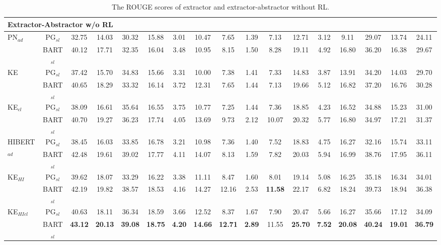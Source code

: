 \begin{table*}[ht!]
\begin{tabular}{|l|c|c|c|c|c|c|c|c|c|c|c|c|c|c|c|c|}
        \multicolumn{17}{|l|}{\bf Extractor-Abstractor w/o RL}\\
        \hline
		\multirow{2}{*}{PN$_{ad}$} & PG$_{sl}$ & 32.75 & 14.03 & 30.32 & 15.88 & 3.01 & 10.47 & 7.65& 1.39& 7.13 & 12.71& 3.12& 9.11 & 29.07 & 13.74& 24.11\\
		& BART$_{sl}$ & 40.12 & 17.71 & 32.35 & 16.04 & 3.48 & 10.95 & 8.15 & 1.50 & 8.28 & 19.11 & 4.92 & 16.80 & 36.20& 16.38& 29.67\\
        \hline
		\multirow{2}{*}{KE} & PG$_{sl}$ & 37.42 & 15.70 & 34.83 & 15.66 & 3.31 & 10.00 & 7.38 & 1.41 & 7.33 & 14.83 &3.87 & 13.91 &34.20 &14.03 & 29.70\\
		& BART$_{sl}$ & 40.65 & 18.29 & 33.32 & 16.14 & 3.72 & 12.31 & 7.65 & 1.44 &7.13 & 19.66 & 5.12 & 16.82 &37.20 &16.76 & 30.28 \\
        \hline
		\multirow{2}{*}{KE$_{cl}$} & PG$_{sl}$ & 38.09 & 16.61&35.64 & 16.55 & 3.75 & 10.77 & 7.25 & 1.44 &7.36& 18.85 & 4.23 & 16.52 & 34.88 & 15.23 & 31.00 \\
		& BART$_{sl}$ & 40.70 & 19.27 & 36.23 & 17.74 & 4.05 & 13.69 & 9.73 & 2.12& 10.07 & 20.32 & 5.77 & 16.80 & 34.97 & 17.21 & 31.37 \\ 
		\hline 
		\multirow{2}{*}{HIBERT$_{ad}$} & PG$_{sl}$ & 38.45 & 16.03 &33.85 & 16.78 & 3.21 & 10.98 & 7.36 & 1.40 & 7.52 & 18.83 & 4.75 & 16.27 & 32.16 & 15.74 & 33.11 \\ 
		& BART$_{sl}$ & 42.48 & 19.61 & 39.02 & 17.77 & 4.11 & 14.07 & 8.13 & 1.59 & 7.82 & 20.03 & 5.94 & 16.99 & 38.76 & 17.95 & 36.11 \\
        \hline
		\multirow{2}{*}{KE$_{HI}$} & PG$_{sl}$ &39.62  & 18.07 & 33.29 & 16.22 & 3.38 & 11.11 &8.47 &1.60 & 8.01 & 19.14& 5.08 &16.25 & 35.18 & 16.34 & 34.01 \\
		& BART$_{sl}$ & 42.19 &  19.82 & 38.57 & 18.53 & 4.16 & 14.27 & 12.16 & 2.53 & \bf 11.58 & 22.17 & 6.82 & 18.24 & 39.73 & 18.94 & 36.38\\
        \hline
		\multirow{2}{*}{KE$_{HIcl}$} & PG$_{sl}$ & 40.63 & 18.11  & 36.34 & 18.59 & 3.66 & 12.52 & 8.37 & 1.67 & 7.90 & 20.47 & 5.66 & 16.27 &35.66 & 17.12 & 34.09 \\
		& BART$_{sl}$ & \bf 43.12 & \bf 20.13 & \bf 39.08 & \bf 18.75 & \bf 4.20 & \bf 14.66  & \bf 12.71 & \bf 2.89& 11.55 & \bf 25.70 & \bf 7.52 & \bf 20.08 & \bf 40.24 & \bf 19.01 & \bf 36.79 \\
        \hline
	\end{tabular}
    \caption{The ROUGE scores of extractor and extractor-abstractor without RL.}
	\label{tab:extabs}
\end{table*}

